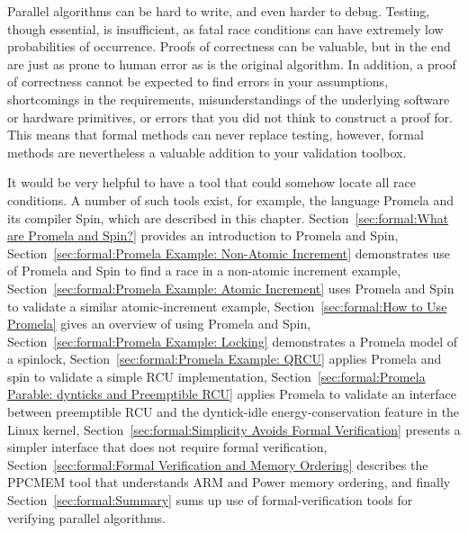 


Parallel algorithms can be hard to write, and even harder to debug.
Testing, though essential, is insufficient, as fatal race conditions
can have extremely low probabilities of occurrence.
Proofs of correctness can be valuable, but in the end are just as
prone to human error as is the original algorithm.
In addition, a proof of correctness cannot be expected to find errors
in your assumptions, shortcomings in the requirements,
misunderstandings of the underlying software or hardware primitives,
or errors that you did not think to construct a proof for.
This means that formal methods can never replace testing, however,
formal methods are nevertheless a valuable addition to your validation toolbox.

It would be very helpful to have a tool that could somehow locate
all race conditions.
A number of such tools exist, for example,
the language Promela and its compiler Spin, which are described in
this chapter.
Section~\ref{sec:formal:What are Promela and Spin?} provides an
introduction to Promela and Spin,
Section~\ref{sec:formal:Promela Example: Non-Atomic Increment}
demonstrates use of Promela and Spin to find a race in a non-atomic increment
example,
Section~\ref{sec:formal:Promela Example: Atomic Increment}
uses Promela and Spin to validate a similar atomic-increment example,
Section~\ref{sec:formal:How to Use Promela}
gives an overview of using Promela and Spin,
Section~\ref{sec:formal:Promela Example: Locking}
demonstrates a Promela model of a spinlock,
Section~\ref{sec:formal:Promela Example: QRCU}
applies Promela and spin to validate a simple RCU implementation,
Section~\ref{sec:formal:Promela Parable: dynticks and Preemptible RCU}
applies Promela to validate an interface between preemptible RCU and
the dyntick-idle energy-conservation feature in the Linux kernel,
Section~\ref{sec:formal:Simplicity Avoids Formal Verification}
presents a simpler interface that does not require formal verification,
Section~\ref{sec:formal:Formal Verification and Memory Ordering}
describes the PPCMEM tool that understands ARM and Power memory ordering,
and finally
Section~\ref{sec:formal:Summary}
sums up use of formal-verification tools for verifying parallel algorithms.


